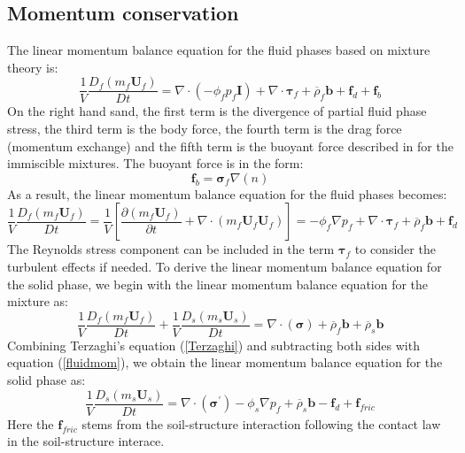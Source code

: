 \documentclass[preprint,12pt]{elsarticle}
\begin{document}
\subsection{\textsf{Momentum conservation}}
\label{Momentum}
%
%
The linear momentum balance equation for the fluid phases based on mixture theory is:\\
%
%
\begin{equation}
    \frac{1}{V}\frac{D_f(m_f \pmb{U}_f)}{Dt} = 
    \nabla \cdot (-\phi_f p_f\pmb{I}) + \nabla \cdot \pmb{\tau}_f + \overline{\rho}_f \pmb{b} + \pmb{f}_{d} + \pmb{f}_b
\end {equation}
%
%
On the right hand sand, the first term is the divergence of partial fluid phase stress, the third term is the body force, the fourth term is the drag force (momentum exchange) and the fifth term is the buoyant force described in \cite{DRUMHELLER} for the immiscible mixtures. The buoyant force is in the form:\\
%
%
\begin{equation}
    \pmb{f}_b = \pmb{\sigma}_f\nabla (n)
\end {equation}
%
%
As a result, the linear momentum balance equation for the fluid phases becomes:
%
%
\begin{equation}
    \label{fluidmom}
     \frac{1}{V}\frac{D_f(m_f \pmb{U}_f)}{Dt} =  \frac{1}{V} \left[ \frac{\partial (m_f \pmb{U}_f)}{\partial t} + \nabla \cdot  (m_f \pmb{U}_f \pmb{U}_f) \right] = -\phi_f \nabla p_f + \nabla \cdot \pmb{\tau}_f + 
   \overline{\rho}_f \pmb{b} +
     \pmb{f}_{d}
\end {equation}
%
%
The Reynolds stress component can be included in the term $\pmb{\tau}_f$ to consider the turbulent effects if needed. To derive the linear momentum balance equation for the solid phase, we begin with the linear momentum balance equation for the mixture as:
%
%
\begin{equation}
    \label{totalmom}
     \frac{1}{V}\frac{D_f(m_f \pmb{U}_f)}{Dt}
    +  \frac{1}{V}\frac{D_s(m_s \pmb{U}_s)}{Dt} = 
    \nabla \cdot (\pmb{\sigma}) + \overline{\rho}_f \pmb{b} 
    + \overline{\rho}_s \pmb{b}
\end {equation}
%
%
Combining Terzaghi's equation (\ref{Terzaghi}) and subtracting both sides with equation (\ref{fluidmom}), we obtain the linear momentum balance equation for the solid phase as:
%
%
\begin{equation}
    \label{solidmom}
     \frac{1}{V}\frac{D_s(m_s \pmb{U}_s)}{Dt} = 
    \nabla \cdot (\pmb{\sigma}^\prime) - \phi_s \nabla p_f 
    + \overline{\rho}_s \pmb{b}
    - \pmb{f}_{d} + \pmb{f}_{fric}
\end {equation}
%
%
Here the $\pmb{f}_{fric}$ stems from the soil-structure interaction following the contact law in the soil-structure interace.
\end{document}

